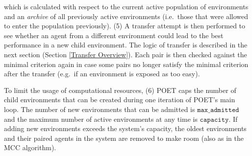 \documentclass{article}
\newcommand{\jc}[1]{\comments{\textcolor{deepForestGreen}{[JC: #1]}}}
\newcommand{\comments}[1]{#1}
\begin{document}
which is calculated with respect to the current active population of environments and an \emph{archive} of all previously active environments (i.e.\ those that were allowed to enter the population previously).
(5) A transfer attempt is then performed to see whether an agent from a different environment could lead to the best performance in a new child environment.  The logic of transfer is described in the next section (Section \ref{Transfer Overview}).  Each pair is then checked against the minimal criterion again in case some pairs no longer satisfy the minimal criterion after the transfer (e.g.\ if 
an environment is exposed as too easy). 

To limit the usage of computational resources, (6) POET caps the number of child environments that can be created during one iteration of POET's main loop.
The number of new environments that can be admitted is $\texttt{max\_admitted}$ and the maximum number of active environments at any time is $\texttt{capacity}$. If adding new environments exceeds the system's capacity, the oldest environments and their paired agents in the system are removed to make room (also as in the MCC algorithm).
\end{document}

